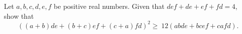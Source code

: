 Let $a,b,c,d,e,f$ be positive real numbers.  Given that $def+de+ef+fd=4$, show that \[ ((a+b)de+(b+c)ef+(c+a)fd)^2 \geq\ 12(abde+bcef+cafd).  \]